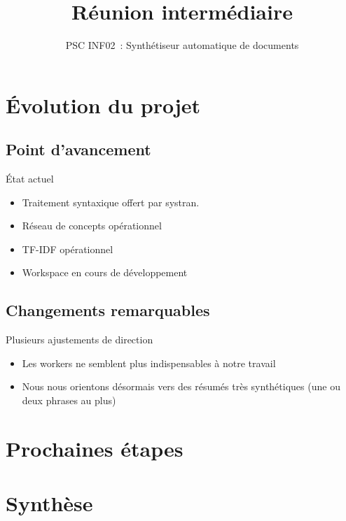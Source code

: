 \documentclass{beamer}
\title{Réunion intermédiaire}
\subtitle{PSC INF02~: Synthétiseur automatique de documents}
\author{}
\institute{École polytechnique}
\date{}
\begin{document}
\beamertemplatenavigationsymbolsempty{}
\beamerdefaultoverlayspecification{<+->}
\begin{frame}
  \titlepage{}
\end{frame}

\section{Évolution du projet}
\subsection{Point d'avancement}

\begin{frame}
  \begin{block}{État actuel}
    \begin{itemize}
      \item Traitement syntaxique offert par systran.
      \item Réseau de concepts opérationnel
      \item TF-IDF opérationnel
      \item Workspace en cours de développement
    \end{itemize}
  \end{block}
\end{frame}

\subsection{Changements remarquables}
\begin{frame}
  \begin{block}{Plusieurs ajustements de direction}
    \begin{itemize}
      \item Les workers ne semblent plus indispensables à notre travail
      \item Nous nous orientons désormais vers des résumés très synthétiques (une ou deux phrases au plus)
    \end{itemize}
  \end{block}
\end{frame}

\section{Prochaines étapes}

\section{Synthèse}
\end{document}
